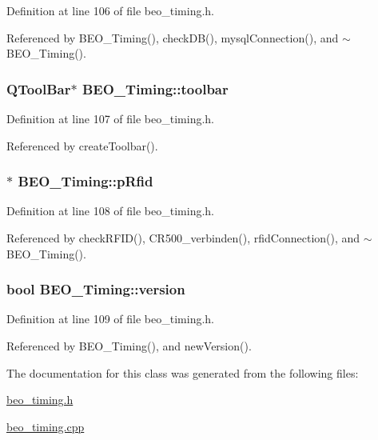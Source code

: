 Definition at line 106 of file beo\_\-timing.h.

Referenced by BEO\_\-Timing(), checkDB(), mysqlConnection(), and $\sim$BEO\_\-Timing().\hypertarget{class_b_e_o___timing_a12a334dd438e255a500dc7591e1f588}{
\subsubsection[toolbar]{\setlength{\rightskip}{0pt plus 5cm}QToolBar$\ast$ {\bf BEO\_\-Timing::toolbar}}}
\label{class_b_e_o___timing_a12a334dd438e255a500dc7591e1f588}




Definition at line 107 of file beo\_\-timing.h.

Referenced by createToolbar().\hypertarget{class_b_e_o___timing_a68330ea7c66ad7f7cf913e31d6facf2}{
\subsubsection[pRfid]{$\ast$ {\bf BEO\_\-Timing::pRfid}}}
\label{class_b_e_o___timing_a68330ea7c66ad7f7cf913e31d6facf2}




Definition at line 108 of file beo\_\-timing.h.

Referenced by checkRFID(), CR500\_\-verbinden(), rfidConnection(), and $\sim$BEO\_\-Timing().\hypertarget{class_b_e_o___timing_670385786b671be23b3b3b10dd3e7b91}{
\subsubsection[version]{\setlength{\rightskip}{0pt plus 5cm}bool {\bf BEO\_\-Timing::version}}}
\label{class_b_e_o___timing_670385786b671be23b3b3b10dd3e7b91}




Definition at line 109 of file beo\_\-timing.h.

Referenced by BEO\_\-Timing(), and newVersion().

The documentation for this class was generated from the following files:\begin{CompactItemize}
\item 
\hyperlink{beo__timing_8h}{beo\_\-timing.h}\item 
\hyperlink{beo__timing_8cpp}{beo\_\-timing.cpp}\end{CompactItemize}
